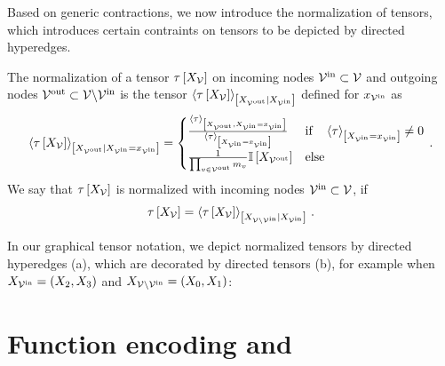 Based on generic contractions, we now introduce the normalization of tensors, which introduces certain contraints on tensors to be depicted by directed hyperedges.

\begin{definition}
    \label{def:normalization}
    The normalization of a tensor $\tau\left[X_{\mathcal{V}}\right]$ on incoming nodes $\mathcal{V}^{\mathrm{in}}\subset\mathcal{V}$ and outgoing nodes $\mathcal{V}^{\mathrm{out}}\subset\mathcal{V}\backslash\mathcal{V}^{\mathrm{in}}$ is the tensor $\left\langle \tau\left[X_{\mathcal{V}}\right]\right\rangle_{\left[ X_{\mathcal{V}^{\mathrm{out}}} | X_{\mathcal{V}^{\mathrm{in}}} \right]}$ defined for $x_{\mathcal{V}^{\mathrm{in}}}$ as
    \begin{align*}
        \left\langle \tau\left[X_{\mathcal{V}}\right]\right\rangle_{\left[ X_{\mathcal{V}^{\mathrm{out}}} | X_{\mathcal{V}^{\mathrm{in}}}=x_{\mathcal{V}^{\mathrm{in}}} \right]}
        = \begin{cases}
              \frac{\left\langle \tau\right\rangle_{\left[ X_{\mathcal{V}^{\mathrm{out}}},X_{\mathcal{V}^{\mathrm{in}}}=x_{\mathcal{V}^{\mathrm{in}}} \right]}}{\left\langle \tau\right\rangle_{\left[ X_{\mathcal{V}^{\mathrm{in}}}=x_{\mathcal{V}^{\mathrm{in}}} \right]}} & \text{if}\quad \left\langle \tau\right\rangle_{\left[ X_{\mathcal{V}^{\mathrm{in}}}=x_{\mathcal{V}^{\mathrm{in}}} \right]} \neq 0 \\
              \frac{1}{\prod_{v\in\mathcal{V}^{\mathrm{out}}}m_{v}}\mathbb{I}\left[X_{\mathcal{V}^{\mathrm{out}}}\right] & \text{else}
        \end{cases} \, .
    \end{align*}
    We say that $\tau\left[X_{\mathcal{V}}\right]$ is normalized with incoming nodes $\mathcal{V}^{\mathrm{in}}\subset\mathcal{V}$, if
    \begin{align*}
        \tau\left[X_{\mathcal{V}}\right]
        = \left\langle \tau\left[X_{\mathcal{V}}\right]\right\rangle_{\left[ X_{\mathcal{V}\backslash\mathcal{V}^{\mathrm{in}}} | X_{\mathcal{V}^{\mathrm{in}}} \right]} \, .
    \end{align*}
\end{definition}

In our graphical tensor notation, we depict normalized tensors by directed hyperedges (a), which are decorated by directed tensors (b), for example when $X_{\mathcal{V}^{\mathrm{in}}}=(X_{2},X_{3})$ and $X_{\mathcal{V}\backslash\mathcal{V}^{\mathrm{in}}}=(X_{0},X_{1})$:
\begin{center}
    
\end{center}

\section{Function encoding and \ComputationActivationNetworks{}}

